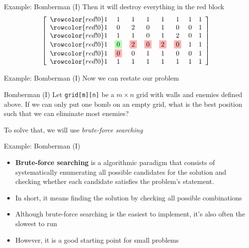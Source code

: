 \documentclass[10pt,xcolor={table,dvipsnames},t]{beamer}
\begin{document}
\begin{frame}{Example: Bomberman (I)}
  Then it will destroy everything in the red block
  \begin{align*}
    \left[
    \begin{array}{cccccccc}
      \rowcolor{red!0}
      1 & 1 & 1 & 1 & 1 & 1 & 1 & 1 \\
      \rowcolor{red!0}
      1 & 0 & 2 & 0 & 1 & 0 & 0 & 1 \\
      \rowcolor{red!0}
      1 & 1 & 1 & 0 & 1 & 2 & 0& 1 \\
      \rowcolor{red!0}
      1 & \fcolorbox{black!0}{green!30}{$0$} & \fcolorbox{black!0}{red!30}{$2$} & \fcolorbox{black!0}{red!30}{$0$} & \fcolorbox{black!0}{red!30}{$2$} & \fcolorbox{black!0}{red!30}{$0$} & 1 & 1 \\
      \rowcolor{red!0}
      1 & \fcolorbox{black!0}{red!30}{$0$} & 0 & 1 & 1 & 0 & 0 & 1 \\
      \rowcolor{red!0}
      1 & 1 & 1 & 1 & 1 & 1 & 1 & 1 
    \end{array}
    \right]
  \end{align*}
\end{frame}

\begin{frame}{Example: Bomberman (I)}
  Now we can restate our problem
  \begin{exampleblock}{Bomberman (I)}
    Let \texttt{grid[m][n]} be a $m\times n$ grid with walls and enemies defined above. If we can only put one bomb on an empty grid, what is the best position such that we can eliminate most enemies?
  \end{exampleblock}
  To solve that, we will use \textit{brute-force searching}
\end{frame}

\begin{frame}{Example: Bomberman (I)}
  \begin{itemize}
    \item \textbf{Brute-force searching} is a algorithmic paradigm that consists of systematically enumerating all possible candidates for the solution and checking whether each candidate satisfies the problem's statement. 
    \item In short, it means finding the solution by checking all possible combinations
    \item Although brute-force searching is the easiest to implement, it's also often the slowest to run 
    \item However, it is a good starting point for small problems
  \end{itemize}
\end{frame}
\end{document}
